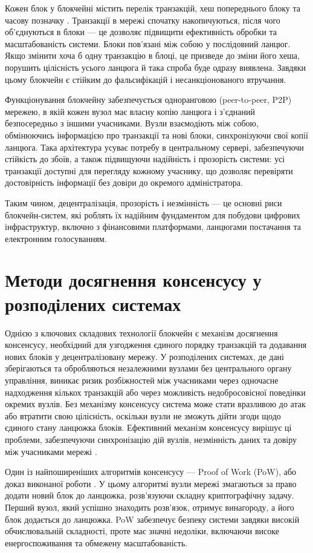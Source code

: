 \documentclass[14pt]{extreport}
\begin{document}
  Кожен блок у блокчейні містить перелік транзакцій, хеш попереднього блоку та часову позначку \cite{blockchain}. Транзакції в мережі спочатку накопичуються, після чого об'єднуються в блоки — це дозволяє підвищити ефективність обробки та масштабованість системи. Блоки пов'язані між собою у послідовний ланцюг. Якщо змінити хоча б одну транзакцію в блоці, це призведе до зміни його хеша, порушить цілісність усього ланцюга й така спроба буде одразу виявлена. Завдяки цьому блокчейн є стійким до фальсифікацій і несанкціонованого втручання.

  Функціонування блокчейну забезпечується одноранговою (peer-to-peer, P2P) мережею, в якій кожен вузол має власну копію ланцюга і з'єднаний безпосередньо з іншими учасниками. Вузли взаємодіють між собою, обмінюючись інформацією про транзакції та нові блоки, синхронізуючи свої копії ланцюга. Така архітектура усуває потребу в центральному сервері, забезпечуючи стійкість до збоїв, а також підвищуючи надійність і прозорість системи: усі транзакції доступні для перегляду кожному учаснику, що дозволяє перевіряти достовірність інформації без довіри до окремого адміністратора.

  Таким чином, децентралізація, прозорість і незмінність — це основні риси блокчейн-систем, які роблять їх надійним фундаментом для побудови цифрових інфраструктур, включно з фінансовими платформами, ланцюгами постачання та електронним голосуванням.

  \section{Методи досягнення консенсусу у розподілених системах}

  Однією з ключових складових технології блокчейн є механізм досягнення консенсусу, необхідний для узгодження єдиного порядку транзакцій та додавання нових блоків у децентралізовану мережу. У розподілених системах, де дані зберігаються та обробляються незалежними вузлами без центрального органу управління, виникає ризик розбіжностей між учасниками через одночасне надходження кількох транзакцій або через можливість недобросовісної поведінки окремих вузлів. Без механізму консенсусу система може стати вразливою до атак або втратити свою цілісність, оскільки вузли не зможуть дійти згоди щодо єдиного стану ланцюжка блоків. Ефективний механізм консенсусу вирішує ці проблеми, забезпечуючи синхронізацію дій вузлів, незмінність даних та довіру між учасниками мережі \cite{consensus}.

  Один із найпоширеніших алгоритмів консенсусу — Proof of Work (PoW), або доказ виконаної роботи \cite{pow}. У цьому алгоритмі вузли мережі змагаються за право додати новий блок до ланцюжка, розв'язуючи складну криптографічну задачу. Перший вузол, який успішно знаходить розв'язок, отримує винагороду, а його блок додається до ланцюжка. PoW забезпечує безпеку системи завдяки високій обчислювальній складності, проте має значні недоліки, включаючи високе енергоспоживання та обмежену масштабованість.
\end{document}
